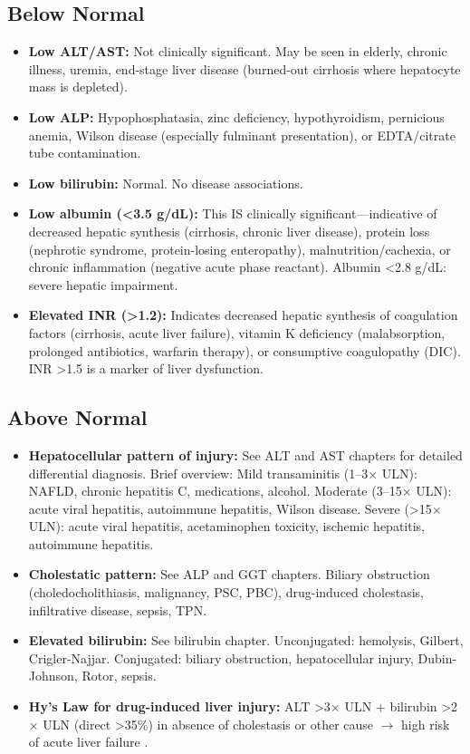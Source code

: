 \subsection*{Below Normal}
\begin{itemize}
  \item \textbf{Low ALT/AST:} Not clinically significant. May be seen in elderly, chronic illness, uremia, end-stage liver disease (burned-out cirrhosis where hepatocyte mass is depleted).
  \item \textbf{Low ALP:} Hypophosphatasia, zinc deficiency, hypothyroidism, pernicious anemia, Wilson disease (especially fulminant presentation), or EDTA/citrate tube contamination.
  \item \textbf{Low bilirubin:} Normal. No disease associations.
  \item \textbf{Low albumin (<3.5 g/dL):} This IS clinically significant---indicative of decreased hepatic synthesis (cirrhosis, chronic liver disease), protein loss (nephrotic syndrome, protein-losing enteropathy), malnutrition/cachexia, or chronic inflammation (negative acute phase reactant). Albumin <2.8 g/dL: severe hepatic impairment.
  \item \textbf{Elevated INR (>1.2):} Indicates decreased hepatic synthesis of coagulation factors (cirrhosis, acute liver failure), vitamin K deficiency (malabsorption, prolonged antibiotics, warfarin therapy), or consumptive coagulopathy (DIC). INR >1.5 is a marker of liver dysfunction.
\end{itemize}

\subsection*{Above Normal}
\begin{itemize}
  \item \textbf{Hepatocellular pattern of injury:} See ALT and AST chapters for detailed differential diagnosis. Brief overview: Mild transaminitis (1--3$\times$ ULN): NAFLD, chronic hepatitis C, medications, alcohol. Moderate (3--15$\times$ ULN): acute viral hepatitis, autoimmune hepatitis, Wilson disease. Severe (>15$\times$ ULN): acute viral hepatitis, acetaminophen toxicity, ischemic hepatitis, autoimmune hepatitis.
  \item \textbf{Cholestatic pattern:} See ALP and GGT chapters. Biliary obstruction (choledocholithiasis, malignancy, PSC, PBC), drug-induced cholestasis, infiltrative disease, sepsis, TPN.
  \item \textbf{Elevated bilirubin:} See bilirubin chapter. Unconjugated: hemolysis, Gilbert, Crigler-Najjar. Conjugated: biliary obstruction, hepatocellular injury, Dubin-Johnson, Rotor, sepsis.
  \item \textbf{Hy's Law for drug-induced liver injury:} ALT >3$\times$ ULN + bilirubin >2$\times$ ULN (direct >35\%) in absence of cholestasis or other cause $\rightarrow$ high risk of acute liver failure \cite{temple2006hys}.
\end{itemize}

